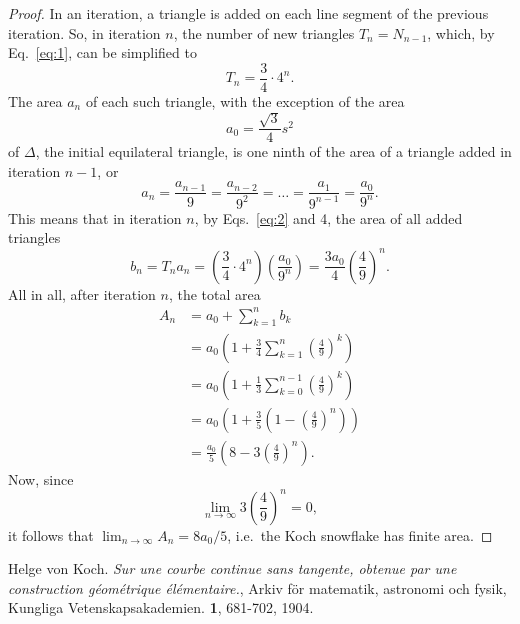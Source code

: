 \documentclass[12pt,a4paper]{article}
\begin{document}
		\begin{proof}
 In an iteration, a triangle is added on each line segment of the previous iteration. So, in iteration $n$, the number of new triangles $T_n = N_{n-1}$, which, by
Eq.~\ref{eq:1}, can be simplified to 
			  \begin{equation}
			   	\label{eq:2}
			   	T_n =\frac{3}{4} \cdot 4^n .
			  \end{equation}
			   The area $a_n$ of each such triangle, with the exception of the area
			 \begin{displaymath}
				a_0 = \frac{\sqrt{3}}{4}s^2
			 \end{displaymath}
			 of $\Delta$, the initial equilateral triangle, is one ninth of the area of a triangle added in iteration $n-1$, or
			\begin{equation}
				\label{eq:3}
				a_n=\frac{a_{n-1}}{9}=\frac{a_{n-2}}{9^2}=\ldots=\frac{a_{1}}{9^{n-1}}=\frac{a_{0}}{9^n}.
			 \end{equation}
			 This means that in iteration $n$, by Eqs.~\ref{eq:2} and 4, the area of all added triangles  
			 \begin{displaymath}
				b_n=T_ {n}a_{n}=\left(\frac{3}{4}\cdot4^n\right)\left(\frac{a_0}{9^n}\right)=\frac{3a_0}{4}\left(\frac{4}{9}\right)^n.
			 \end{displaymath}
			   All in all, after iteration $n$, the total area
			  \begin{align*}
			           A_n &= a_0 + \sum_{k=1}^n b_k \\
			           &=a_0\left(1+\frac{3}{4}\sum_{k=1}^n\left(\frac{4}{9}\right)^k \right) \\
				&=a_0\left(1+\frac{1}{3}\sum_{k=0}^{n-1}\left(\frac{4}{9}\right)^k \right) \\
				&=a_0\left(1+\frac{3}{5}\left(1-\left(\frac{4}{9}\right)^n\right)\right)\\
				&=\frac{a_0}{5}\left(8-3\left(\frac{4}{9}\right)^n \right).
			   \end{align*}
			  Now, since
			\begin{displaymath}
			   \lim_{n \to \infty}3\left(\frac{4}{9}\right)^n=0,
			\end{displaymath}
			 it follows that $\lim_{n \to \infty}A_n=8a_0/5$, i.e.\ the Koch snowflake has finite area.  
		\end{proof}

	
	
	\begin{thebibliography}{99}
	   Helge von Koch. 
	    \emph{Sur une courbe continue sans tangente, obtenue par une
	    construction géométrique élémentaire.}, 
	    Arkiv för matematik, astronomi och fysik, 
	    Kungliga Vetenskapsakademien. 
	    \textbf{1}, 681-702, 1904.
	\end{thebibliography}
\end{document}
